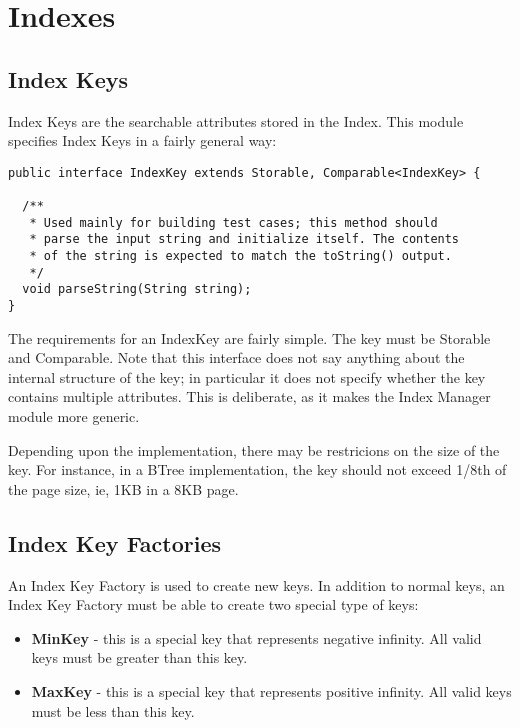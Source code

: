 \documentclass[a4paper,draft,oneside]{book}
\begin{document}
\chapter{Indexes}


\section{Index Keys}

Index Keys are the searchable attributes stored in the Index. This module
specifies Index Keys in a fairly general way:

\begin{verbatim}
public interface IndexKey extends Storable, Comparable<IndexKey> {
	
  /**
   * Used mainly for building test cases; this method should
   * parse the input string and initialize itself. The contents 
   * of the string is expected to match the toString() output.
   */
  void parseString(String string);
}
\end{verbatim}

The requirements for an IndexKey are fairly simple. The key must be
Storable and Comparable. Note that this interface does not say anything
about the internal structure of the key; in particular it does not 
specify whether the key contains multiple attributes. This is deliberate,
as it makes the Index Manager module more generic.

Depending upon the implementation, there may be restricions on the
size of the key. For instance, in a BTree implementation, the key
should not exceed 1/8th of the page size, ie, 1KB in a 8KB page. 

\section{Index Key Factories}

An Index Key Factory is used to create new keys. In addition to normal keys, an Index
Key Factory must be able to create two special type of keys:

\begin{itemize}
	\item \textbf{MinKey} - this is a special key that represents negative infinity. All valid keys must be greater than this key.
	\item \textbf{MaxKey} - this is a special key that represents positive infinity. All valid keys must be less than this key.
\end{itemize}
\end{document}
